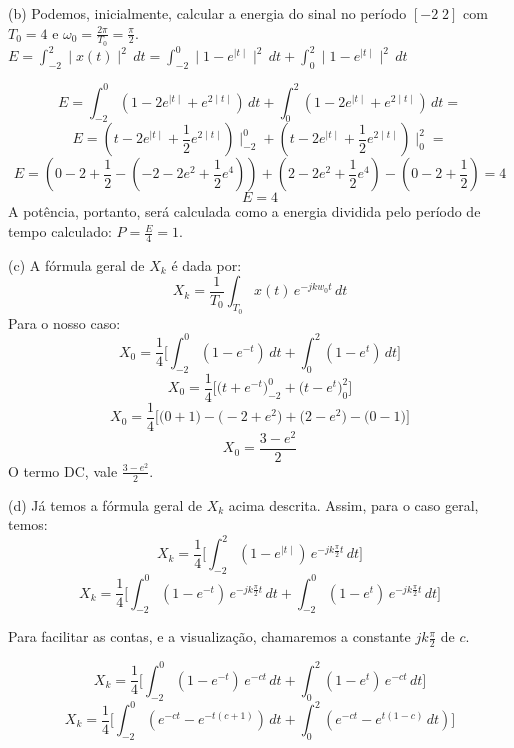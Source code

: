 \documentclass{article}
\begin{document}
\vspace{\baselineskip}

(b) Podemos, inicialmente, calcular a energia do sinal no período $[-2\;2]$ com $T_{0} = 4$ e $\omega_{0} = \frac{2 \pi}{T_{0}} = \frac{\pi}{2}$.\\
$E = \int_{-2}^{2} \mid x(t) \mid ^{2}\,dt = \int_{-2}^{0} \mid 1 - e^{\mid t\mid} \mid^{2}\,dt + \int_{0}^{2} \mid 1 - e^{\mid t\mid} \mid^{2}\,dt$

\[E = \int_{-2}^{0} (1 - 2e^{\mid t \mid} + e^{2\mid t \mid})\,dt + \int_{0}^{2} (1 - 2e^{\mid t \mid} + e^{2\mid t \mid})\,dt =\]
\[E = (t - 2e^{\mid t \mid} + \frac{1}{2}e^{2 \mid t \mid}) \mid_{-2}^{0} + (t - 2e^{\mid t \mid} + \frac{1}{2}e^{2 \mid t \mid}) \mid_{0}^{2} = \]
\[E = (0 -2 + \frac{1}{2} - (-2 - 2e^{2} + \frac{1}{2}e^{4})) + (2 - 2e^{2} + \frac{1}{2}e^{4}) - (0 -2 + \frac{1}{2}) = 4\]
\[E = 4\]
A potência, portanto, será calculada como a energia dividida pelo período de tempo calculado: $P = \frac{E}{4} = 1$.

\vspace{\baselineskip}

(c) A fórmula geral de $X_{k}$ é dada por:
\[X_{k} = \frac{1}{T_{0}} \int_{T_{0}} x(t)\,e^{-jkw_{0}t}\,dt\]
Para o nosso caso:
\[X_{0} = \frac{1}{4} \biggl[\int_{-2}^{0} (1 - e^{-t})\,dt + \int_{0}^{2} (1 - e^{t})\,dt\biggr]\]
\[X_{0} = \frac{1}{4} \biggl[\bigl(t + e^{-t}\bigr)_{-2}^{0} + \bigl(t - e^{t}\bigr)_{0}^{2}\biggr]\]
\[X_{0} = \frac{1}{4} \biggl[\bigl(0 + 1\bigr) - \bigl(-2 + e^{2}\bigr) + \bigl(2 - e^{2}\bigr) - \bigl(0 - 1\bigr)\biggr]\]
\[X_{0} = \frac{3 - e^{2}}{2}\]
O termo DC, vale $\frac{3 - e^{2}}{2}$.

\vspace{\baselineskip}

(d) Já temos a fórmula geral de $X_{k}$ acima descrita. Assim, para o caso geral, temos:
\[X_{k} = \frac{1}{4}\biggl[\int_{-2}^{2} (1 - e^{\mid t \mid})\,e^{-jk\frac{\pi}{2}t}\,dt\biggr]\]
\[X_{k} = \frac{1}{4}\biggl[\int_{-2}^{0} (1 - e^{-t})\,e^{-jk\frac{\pi}{2}t}\,dt + \int_{-2}^{0} (1 - e^{t})\,e^{-jk\frac{\pi}{2}t}\,dt\biggr]\]

\vspace{\baselineskip}

Para facilitar as contas, e a visualização, chamaremos a constante $jk\frac{\pi}{2}$ de $c$.

\vspace{\baselineskip}

\[X_{k} = \frac{1}{4} \biggl[\int_{-2}^{0} (1 - e^{-t})\,e^{-ct}\,dt + \int_{0}^{2} (1 - e^{t})\,e^{-ct}\,dt\biggr]\]
\[X_{k} = \frac{1}{4} \biggl[\int_{-2}^{0} (e^{-ct} - e^{-t(c + 1)})\,dt + \int_{0}^{2} (e^{-ct} - e^{t(1 - c)}\,dt)\biggr]\]
\end{document}
